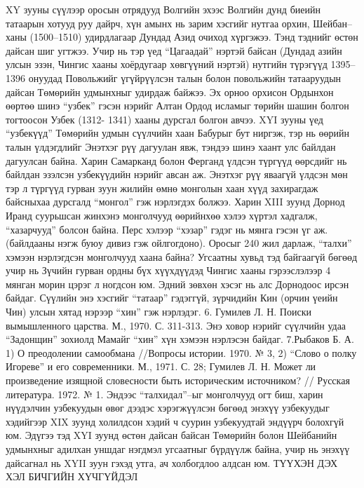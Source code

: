 XY зууны сүүлээр оросын отрядууд Волгийн эхээс Волгийн дунд биеийн татаарын хотууд руу дайрч, хүн амынх нь зарим хэсгийг нутгаа орхин, Шейбан–ханы (1500–1510) удирдлагаар Дундад Азид очиход хүргэжээ. Тэнд тэднийг өстөн дайсан шиг угтжээ. Учир нь тэр үед “Цагаадай” нэртэй байсан (Дундад азийн улсын эзэн, Чингис хааны хоёрдугаар хөвгүүний нэртэй) нутгийн түрэгүүд 1395–1396 онуудад Повольжийг үгүйрүүлсэн талын болон повольжийн татааруудын дайсан Төмөрийн удмынхныг удирдаж байжээ.
Эх орноо орхисон Ордынхон өөртөө шинэ “узбек” гэсэн нэрийг Алтан Ордод исламыг төрийн шашин болгон тогтоосон Узбек (1312- 1341) хааны дурсгал болгон авчээ. XYI зууны үед “узбекүүд” Төмөрийн удмын сүүлчийн хаан Бабурыг бут ниргэж, тэр нь өөрийн талын үлдэгдлийг Энэтхэг рүү дагуулан явж, тэндээ шинэ хаант улс байлдан дагуулсан байна. Харин Самарканд болон Ферганд үлдсэн түргүүд өөрсдийг нь байлдан эзэлсэн узбекүүдийн нэрийг авсан аж. Энэтхэг рүү яваагүй үлдсэн мөн тэр л түргүүд гурван зуун жилийн өмнө монголын хаан хүүд захирагдаж байсныхаа дурсгалд “монгол” гэж нэрлэгдэх болжээ. Харин XIII зуунд Дорнод Иранд суурьшсан жинхэнэ монголчууд өөрийнхөө хэлээ хүртэл хадгалж, “хазарчууд” болсон байна. Перс хэлээр “хэзар” гэдэг нь мянга гэсэн үг аж. (байлдааны нэгж буюу дивиз гэж ойлгогдоно). Оросыг 240 жил дарлаж, “талхи” хэмээн нэрлэгдсэн монголчууд хаана байна? Угсаатны хувьд тэд байгаагүй бөгөөд учир нь Зүчийн гурван ордны бүх хүүхдүүдэд Чингис хааны гэрээслэлээр 4 мянган морин цэрэг л ногдсон юм. Эдний зөвхөн хэсэг нь алс Дорнодоос ирсэн байдаг. Сүүлийн энэ хэсгийг “татаар” гэдэггүй, зүрчидийн Кин (орчин үеийн Чин) улсын хятад нэрээр “хин” гэж нэрлэдэг. 6. Гумилев Л. Н. Поиски вымышленного царства. М., 1970. С. 311-313. Энэ ховор нэрийг сүүлчийн удаа “Задонщин” зохиолд Мамайг “хин” хүн хэмээн нэрлэсэн байдаг. 7.Рыбаков Б. А. 1) О преодолении самообмана //Вопросы истории. 1970. № 3, 2) “Слово о полку Игореве” и его современники. М., 1971. С. 28; Гумилев Л. Н. Может ли произведение изящной словесности быть историческим источником? // Русская литература. 1972. № 1.
Эндээс “талхидал”–ыг монголчууд огт биш, харин нүүдэлчин узбекуудын өвөг дээдэс хэрэгжүүлсэн бөгөөд энэхүү узбекуудыг хэдийгээр XIX зуунд холилдсон хэдий ч суурин узбекуудтай эндүүрч болохгүй юм. Эдүгээ тэд XYI зуунд өстөн дайсан байсан Төмөрийн болон Шейбанийн удмынхныг адилхан уншдаг нэгдмэл угсаатныг бүрдүүлж байна, учир нь энэхүү дайсагнал нь XYII зуун гэхэд утга, ач холбогдлоо алдсан юм.
ТҮҮХЭН ДЭХ ХЭЛ БИЧГИЙН ХҮЧГҮЙДЭЛ
